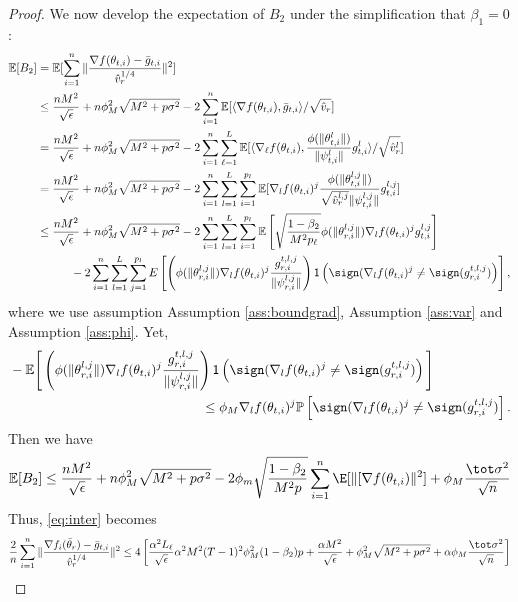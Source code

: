 \documentclass[nohyperref]{article}
\theoremstyle{plain}
\theoremstyle{definition}
\theoremstyle{remark}
\begin{document}
\begin{proof}


We now develop the expectation of $B_2$ under the simplification that $\beta_1 = 0$:
\begin{align}\notag
    \mathbb E[B_2]&=\mathbb E[\sum_{i=1}^n\Vert \frac{\nabla f(\theta_{t,i})-\bar g_{t,i}}{\hat v_r^{1/4}} \Vert^2] \\\notag
    &\leq \frac{nM^2}{\sqrt{\epsilon}}+n\phi_M^2\sqrt{M^2+p\sigma^2}-2\sum_{i=1}^n\mathbb E[\langle \nabla f(\theta_{t,i}),\bar g_{t,i} \rangle/\sqrt{\hat v_r}]\\\notag
    &=\frac{nM^2}{\sqrt{\epsilon}}+n\phi_M^2\sqrt{M^2+p\sigma^2}-2\sum_{i=1}^n \sum_{\ell=1}^L \mathbb E[\langle \nabla_\ell f(\theta_{t,i}),\frac{\phi(\|\theta_{t,i}^l \|)}{\| \psi_{t,i}^l \|}g_{t,i}^l \rangle/\sqrt{\hat v_r^l}]\\\notag
    &=\frac{nM^2}{\sqrt{\epsilon}}+n\phi_M^2\sqrt{M^2+p\sigma^2}-2\sum_{i=1}^n \sum_{l=1}^L\sum_{i=1}^{p_l} \mathbb E[\nabla_l f(\theta_{t,i})^j\frac{\phi(\|\theta_{t,i}^{l,j} \|)}{\sqrt{\hat v_r^{l,j}}\| \psi_{t,i}^{l,j} \|}g_{t,i}^{l,j} ]\\\notag
    & \leq \frac{nM^2}{\sqrt{\epsilon}}+n\phi_M^2\sqrt{M^2+p\sigma^2}-2\sum_{i=1}^n \sum_{l=1}^L\sum_{i=1}^{p_l} \mathbb E \left[ \sqrt{\frac{1-\beta_2}{M^2 p_\ell}}  \phi(\|\theta_{r,i}^{l,j}\|)  \nabla_l f(\theta_{t,i})^j  g_{t,i}^{l,j}\right]\\\notag
    &\hspace{0.4in} -2 \sum_{i = 1}^n \sum_{l=1}^L\sum_{j=1}^{p_l}  E \left[  \left( \phi(\|\theta_{r,i}^{l,j}\|)   \nabla_l f(\theta_{t,i})^j   \frac{g_{r,i}^{t,l,j}}{ \|\psi_{r,i}^{l,j}\|}\right)\mathsf{1}\left( \sign(  \nabla_l f(\theta_{t,i})^j \neq  \sign( g_{r,i}^{t,l,j}) \right)\right],
\end{align}
where we use assumption Assumption \ref{ass:boundgrad}, Assumption \ref{ass:var} and Assumption \ref{ass:phi}. 
Yet,
\begin{align*}
&- \mathbb E \Bigg[  \left( \phi(\|\theta_{r,i}^{l,j}\|)   \nabla_l f(\theta_{t,i})^j   \frac{g_{r,i}^{t,l,j}}{ \|\psi_{r,i}^{l,j}\|}\right)\mathsf{1}\left( \sign(  \nabla_l f(\theta_{t,i})^j
\neq  \sign( g_{r,i}^{t,l,j}) \right)\Bigg] \\
&\hspace{2in} \leq  \phi_M \nabla_l f(\theta_{t,i})^j   \mathbb{P}\left[  \sign(  \nabla_l f(\theta_{t,i})^j \neq  \sign( g_{r,i}^{t,l,j}) \right].
\end{align*}
Then we have
\begin{align}\notag
    \mathbb E[B_2]\leq  \frac{nM^2}{\sqrt{\epsilon}}+n\phi_M^2\sqrt{M^2+p\sigma^2}-2 \phi_m \sqrt{\frac{1-\beta_2}{M^2 p}} \sum_{i=1}^n \E[\| [\nabla f(\theta_{t,i}) \|^2] + \phi_M \frac{\tot \sigma^2}{\sqrt{n}}
\end{align}
Thus, \eqref{eq:inter} becomes
\begin{align}\notag
    \frac{2}{n}\sum_{i=1}^n\Vert \frac{\nabla f_i(\bar\theta_r)-\bar g_{t,i}}{\hat v_r^{1/4}} \Vert^2 \leq 4 \left[ \frac{\alpha^2 L_\ell}{\sqrt{\epsilon}} \alpha^2 M^2 (T-1)^2 \phi_M^2 (1-\beta_2)p + \frac{\alpha M^2}{\sqrt{\epsilon}}+\phi_M^2\sqrt{M^2+p\sigma^2} + \alpha\phi_M \frac{\tot \sigma^2}{\sqrt{n}}\right]
\end{align}


\end{proof}
\end{document}
